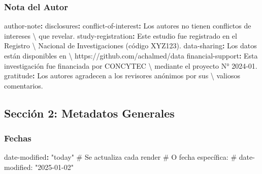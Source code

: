 \documentclass[
  doc,
  floatsintext,
  longtable,
  a4paper,
  nolmodern,
  notxfonts,
  notimes,
  12pt,
  colorlinks=true,linkcolor=blue,citecolor=blue,urlcolor=blue]{apa7}
\newenvironment{Shaded}{\begin{snugshade}}{\end{snugshade}}
\newcommand{\AttributeTok}[1]{\textcolor[rgb]{0.40,0.45,0.13}{#1}}
\newcommand{\CommentTok}[1]{\textcolor[rgb]{0.37,0.37,0.37}{#1}}
\newcommand{\FunctionTok}[1]{\textcolor[rgb]{0.28,0.35,0.67}{#1}}
\newcommand{\KeywordTok}[1]{\textcolor[rgb]{0.00,0.23,0.31}{\textbf{#1}}}
\newcommand{\StringTok}[1]{\textcolor[rgb]{0.13,0.47,0.30}{#1}}
\begin{document}
\subsubsection{Nota del Autor}\label{nota-del-autor}

\begin{Shaded}
\begin{Highlighting}[]
\FunctionTok{author{-}note}\KeywordTok{:}
\AttributeTok{  }\FunctionTok{disclosures}\KeywordTok{:}
\AttributeTok{    }\FunctionTok{conflict{-}of{-}interest}\KeywordTok{:}\AttributeTok{ Los autores no tienen conflictos de intereses  \textbackslash{}}
\AttributeTok{    que revelar.}
\AttributeTok{    }\FunctionTok{study{-}registration}\KeywordTok{:}\AttributeTok{ Este estudio fue registrado en el Registro       \textbackslash{} }
\AttributeTok{    Nacional de Investigaciones (código XYZ123).}
\AttributeTok{    }\FunctionTok{data{-}sharing}\KeywordTok{:}\AttributeTok{ Los datos están disponibles en                         \textbackslash{} }
\AttributeTok{    https://github.com/achalmed/data}
\AttributeTok{    }\FunctionTok{financial{-}support}\KeywordTok{:}\AttributeTok{ Esta investigación fue financiada por CONCYTEC    \textbackslash{} }
\AttributeTok{    mediante el proyecto N° 2024{-}01.}
\AttributeTok{    }\FunctionTok{gratitude}\KeywordTok{:}\AttributeTok{ Los autores agradecen a los revisores anónimos por sus    \textbackslash{} }
\AttributeTok{    valiosos comentarios.}
\end{Highlighting}
\end{Shaded}

\subsection{Sección 2: Metadatos
Generales}\label{secciuxf3n-2-metadatos-generales}

\subsubsection{Fechas}\label{fechas}

\begin{Shaded}
\begin{Highlighting}[]
\FunctionTok{date{-}modified}\KeywordTok{:}\AttributeTok{ }\StringTok{"today"}\CommentTok{                    \# Se actualiza cada render}
\CommentTok{\# O fecha específica:}
\CommentTok{\# date{-}modified: "2025{-}01{-}02"}
\end{Highlighting}
\end{Shaded}
\end{document}
